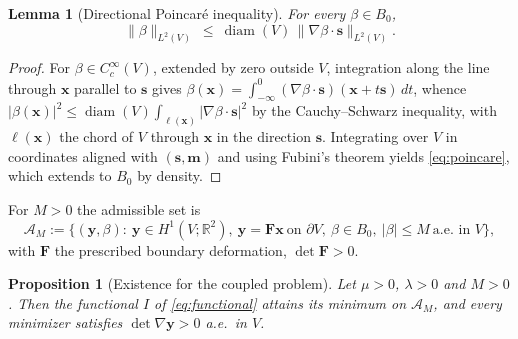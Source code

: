 \documentclass[12pt]{article}
\theoremstyle{plain}
\newtheorem{proposition}[theorem]{Proposition}
\newtheorem{lemma}[theorem]{Lemma}
\theoremstyle{definition}
\newcommand{\bF}{\bm{F}}
\newcommand{\bs}{\bm{s}}
\newcommand{\bmm}{\bm{m}}
\newcommand{\by}{\bm{y}}
\newcommand{\bx}{\bm{x}}
\newcommand{\R}{\mathbb{R}}
\begin{document}
\begin{lemma}[Directional Poincar\'e inequality]\label{lem:poincare}
For every $\beta\in B_{0}$,
\begin{equation}\label{eq:poincare}
  \|\beta\|_{L^{2}(V)}\ \le\ \operatorname{diam}(V)\,
  \|\nabla\beta\cdot\bs\|_{L^{2}(V)} .
\end{equation}
\end{lemma}

\begin{proof}
For $\beta\in C_{c}^{\infty}(V)$, extended by zero outside $V$, integration
along the line through $\bx$ parallel to $\bs$ gives
$\beta(\bx)=\int_{-\infty}^{0}(\nabla\beta\cdot\bs)(\bx+t\bs)\,dt$, whence
$|\beta(\bx)|^{2}\le\operatorname{diam}(V)\int_{\ell(\bx)}|\nabla\beta\cdot\bs|^{2}$
by the Cauchy--Schwarz inequality, with $\ell(\bx)$ the chord of $V$ through
$\bx$ in the direction $\bs$. Integrating over $V$ in coordinates aligned with
$(\bs,\bmm)$ and using Fubini's theorem yields \eqref{eq:poincare}, which
extends to $B_{0}$ by density.
\end{proof}

For $M>0$ the admissible set is
\begin{equation}\label{eq:admissible}
  \mathcal{A}_{M}:=\bigl\{(\by,\beta):\ \by\in H^{1}(V;\R^{2}),\
  \by=\bF\bx\ \text{on }\partial V,\ \beta\in B_{0},\
  |\beta|\le M\ \text{a.e.\ in }V\bigr\},
\end{equation}
with $\bF$ the prescribed boundary deformation, $\det\bF>0$.

\begin{proposition}[Existence for the coupled problem]\label{prop:existence}
Let $\mu>0$, $\lambda>0$ and $M>0$. Then the functional $I$ of
\eqref{eq:functional} attains its minimum on $\mathcal{A}_{M}$, and every
minimizer satisfies $\det\nabla\by>0$ a.e.\ in $V$.
\end{proposition}
\end{document}
